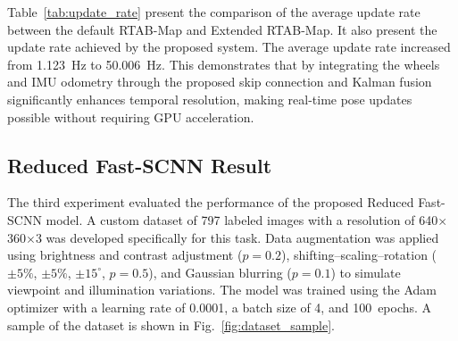 \documentclass[conference, a4paper]{IEEEtran}[2015/08/26]
\begin{document}
Table~\ref{tab:update_rate} present the comparison of the average update rate between the default RTAB-Map and Extended RTAB-Map. It also present the update rate achieved by the proposed system. The average update rate increased from 1.123~Hz to 50.006~Hz. This demonstrates that by integrating the wheels and IMU odometry through the proposed skip connection and Kalman fusion significantly enhances temporal resolution, making real-time pose updates possible without requiring GPU acceleration.

\subsection{Reduced Fast-SCNN Result}


The third experiment evaluated the performance of the proposed Reduced Fast-SCNN model. A custom dataset of 797 labeled images with a resolution of 640$\times$360$\times$3 was developed specifically for this task. Data augmentation was applied using brightness and contrast adjustment ($p=0.2$), shifting--scaling--rotation ($\pm5\%$, $\pm5\%$, $\pm15^{\circ}$, $p=0.5$), and Gaussian blurring ($p=0.1$) to simulate viewpoint and illumination variations. The model was trained using the Adam optimizer with a learning rate of 0.0001, a batch size of 4, and 100~epochs. A sample of the dataset is shown in Fig.~\ref{fig:dataset_sample}.
\end{document}

